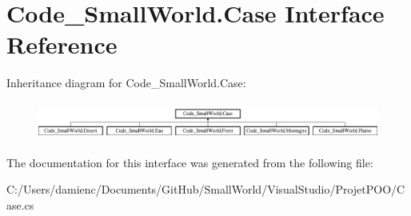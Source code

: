 \hypertarget{interface_code___small_world_1_1_case}{\section{Code\-\_\-\-Small\-World.\-Case Interface Reference}
\label{interface_code___small_world_1_1_case}
}
Inheritance diagram for Code\-\_\-\-Small\-World.\-Case\-:\begin{figure}[H]
\begin{center}
\leavevmode
\includegraphics[height=1.244444cm]{interface_code___small_world_1_1_case}
\end{center}
\end{figure}


The documentation for this interface was generated from the following file\-:\begin{DoxyCompactItemize}
\item 
C\-:/\-Users/damienc/\-Documents/\-Git\-Hub/\-Small\-World/\-Visual\-Studio/\-Projet\-P\-O\-O/Case.\-cs\end{DoxyCompactItemize}
